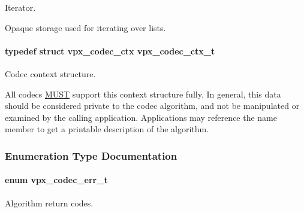Iterator. 

Opaque storage used for iterating over lists. 
\paragraph[{\texorpdfstring{vpx\+\_\+codec\+\_\+ctx\+\_\+t}{vpx_codec_ctx_t}}]{\setlength{\rightskip}{0pt plus 5cm}typedef struct {\bf vpx\+\_\+codec\+\_\+ctx}  {\bf vpx\+\_\+codec\+\_\+ctx\+\_\+t}}\hypertarget{group__codec_gad03e2dfa6ae511db7d25be6bbb336233}{}\label{group__codec_gad03e2dfa6ae511db7d25be6bbb336233}


Codec context structure. 

All codecs \hyperlink{rfc2119_MUST}{M\+U\+ST} support this context structure fully. In general, this data should be considered private to the codec algorithm, and not be manipulated or examined by the calling application. Applications may reference the \textquotesingle{}name\textquotesingle{} member to get a printable description of the algorithm. 

\subsubsection{Enumeration Type Documentation}
\paragraph[{\texorpdfstring{vpx\+\_\+codec\+\_\+err\+\_\+t}{vpx_codec_err_t}}]{\setlength{\rightskip}{0pt plus 5cm}enum {\bf vpx\+\_\+codec\+\_\+err\+\_\+t}}\hypertarget{group__codec_gada1084710837ad363b92f2379dd2b8d2}{}\label{group__codec_gada1084710837ad363b92f2379dd2b8d2}


Algorithm return codes. 

